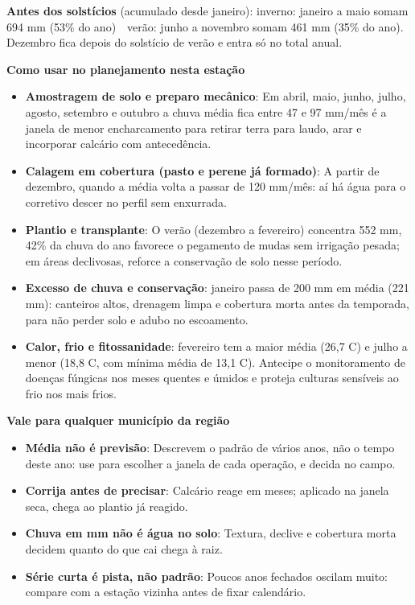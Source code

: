 \documentclass[10pt,a4paper]{article}
\begin{document}
\vspace{1pt}
{\footnotesize\textbf{Antes dos solstícios} (acumulado desde janeiro):
inverno: janeiro a maio somam 694 mm (53\% do ano) \,\textbullet\, verão: junho a novembro somam 461 mm (35\% do ano). Dezembro fica depois do solstício de verão e entra só no total
anual.}

\vspace{2pt}
{\bfseries\small Como usar no planejamento nesta estação}

\footnotesize\begin{itemize}\setlength{\itemsep}{0.5pt}
  \item \textbf{Amostragem de solo e preparo mecânico}: Em abril, maio, junho, julho, agosto, setembro e outubro a chuva média fica entre 47 e 97 mm/mês \textemdash{} é a janela de menor encharcamento para retirar terra para laudo, arar e incorporar calcário com antecedência.
  \item \textbf{Calagem em cobertura (pasto e perene já formado)}: A partir de dezembro, quando a média volta a passar de 120 mm/mês: aí há água para o corretivo descer no perfil sem enxurrada.
  \item \textbf{Plantio e transplante}: O verão (dezembro a fevereiro) concentra 552 mm, 42\% da chuva do ano \textemdash{} favorece o pegamento de mudas sem irrigação pesada; em áreas declivosas, reforce a conservação de solo nesse período.
  \item \textbf{Excesso de chuva e conservação}: janeiro passa de 200 mm em média (221 mm): canteiros altos, drenagem limpa e cobertura morta antes da temporada, para não perder solo e adubo no escoamento.
  \item \textbf{Calor, frio e fitossanidade}: fevereiro tem a maior média (26,7 \textdegree{}C) e julho a menor (18,8 \textdegree{}C, com mínima média de 13,1 \textdegree{}C). Antecipe o monitoramento de doenças fúngicas nos meses quentes e úmidos e proteja culturas sensíveis ao frio nos mais frios.
\end{itemize}

\vspace{1pt}
{\bfseries\small Vale para qualquer município da região}

\scriptsize\begin{itemize}\setlength{\itemsep}{0.5pt}
  \item \textbf{Média não é previsão}: Descrevem o padrão de vários anos, não o tempo deste ano: use para escolher a janela de cada operação, e decida no campo.
  \item \textbf{Corrija antes de precisar}: Calcário reage em meses; aplicado na janela seca, chega ao plantio já reagido.
  \item \textbf{Chuva em mm não é água no solo}: Textura, declive e cobertura morta decidem quanto do que cai chega à raiz.
  \item \textbf{Série curta é pista, não padrão}: Poucos anos fechados oscilam muito: compare com a estação vizinha antes de fixar calendário.
\end{itemize}
\end{document}
